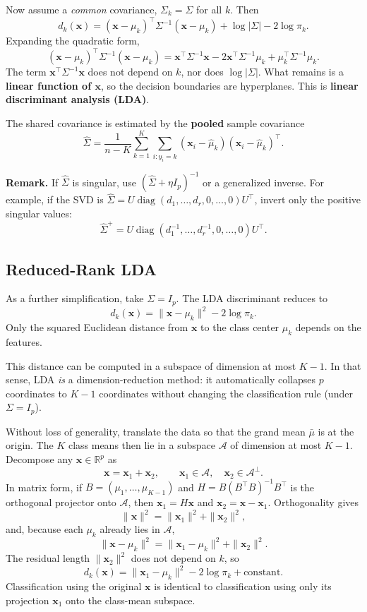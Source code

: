 \documentclass[
]{book}
\begin{document}
Now assume a \emph{common} covariance, \(\Sigma_k = \Sigma\) for all \(k\). Then
\[
d_k(\mathbf{x}) = (\mathbf{x} - \mu_k)^\top \Sigma^{-1} (\mathbf{x} - \mu_k) + \log|\Sigma| - 2\log \pi_k.
\]
Expanding the quadratic form,
\[
(\mathbf{x} - \mu_k)^\top \Sigma^{-1} (\mathbf{x} - \mu_k)
= \mathbf{x}^\top \Sigma^{-1} \mathbf{x} - 2\mathbf{x}^\top \Sigma^{-1} \mu_k + \mu_k^\top \Sigma^{-1} \mu_k.
\]
The term \(\mathbf{x}^\top \Sigma^{-1} \mathbf{x}\) does not depend on \(k\), nor does \(\log|\Sigma|\). What remains is a \textbf{linear function of \(\mathbf{x}\)}, so the decision boundaries are hyperplanes. This is \textbf{linear discriminant analysis (LDA)}.

The shared covariance is estimated by the \textbf{pooled} sample covariance
\[
\hat{\Sigma} = \frac{1}{n - K} \sum_{k=1}^{K} \sum_{i: y_i = k} (\mathbf{x}_i - \hat{\mu}_k)(\mathbf{x}_i - \hat{\mu}_k)^\top.
\]

\textbf{Remark.} If \(\hat{\Sigma}\) is singular, use \((\hat{\Sigma} + \eta I_p)^{-1}\) or a generalized inverse. For example, if the SVD is \(\hat{\Sigma} = U \operatorname{diag}(d_1, \ldots, d_r, 0, \ldots, 0) U^\top\), invert only the positive singular values:
\[
\hat{\Sigma}^{+} = U \operatorname{diag}(d_1^{-1}, \ldots, d_r^{-1}, 0, \ldots, 0) U^\top.
\]

\subsection{Reduced-Rank LDA}\label{reduced-rank-lda}

As a further simplification, take \(\Sigma = I_p\). The LDA discriminant reduces to
\[
d_k(\mathbf{x}) = \|\mathbf{x} - \mu_k\|^2 - 2\log \pi_k.
\]
Only the squared Euclidean distance from \(\mathbf{x}\) to the class center \(\mu_k\) depends on the features.

This distance can be computed in a subspace of dimension at most \(K-1\). In that sense, LDA \emph{is} a dimension-reduction method: it automatically collapses \(p\) coordinates to \(K-1\) coordinates without changing the classification rule (under \(\Sigma = I_p\)).

Without loss of generality, translate the data so that the grand mean \(\bar{\mu}\) is at the origin. The \(K\) class means then lie in a subspace \(\mathcal{A}\) of dimension at most \(K-1\). Decompose any \(\mathbf{x} \in \mathbb{R}^p\) as
\[
\mathbf{x} = \mathbf{x}_1 + \mathbf{x}_2, \qquad \mathbf{x}_1 \in \mathcal{A}, \quad \mathbf{x}_2 \in \mathcal{A}^\perp.
\]
In matrix form, if \(B = (\mu_1, \ldots, \mu_{K-1})\) and \(H = B(B^\top B)^{-1} B^\top\) is the orthogonal projector onto \(\mathcal{A}\), then \(\mathbf{x}_1 = H\mathbf{x}\) and \(\mathbf{x}_2 = \mathbf{x} - \mathbf{x}_1\). Orthogonality gives
\[
\|\mathbf{x}\|^2 = \|\mathbf{x}_1\|^2 + \|\mathbf{x}_2\|^2,
\]
and, because each \(\mu_k\) already lies in \(\mathcal{A}\),
\[
\|\mathbf{x} - \mu_k\|^2 = \|\mathbf{x}_1 - \mu_k\|^2 + \|\mathbf{x}_2\|^2.
\]
The residual length \(\|\mathbf{x}_2\|^2\) does not depend on \(k\), so
\[
d_k(\mathbf{x}) = \|\mathbf{x}_1 - \mu_k\|^2 - 2\log \pi_k + \text{constant}.
\]
Classification using the original \(\mathbf{x}\) is identical to classification using only its projection \(\mathbf{x}_1\) onto the class-mean subspace.
\end{document}
